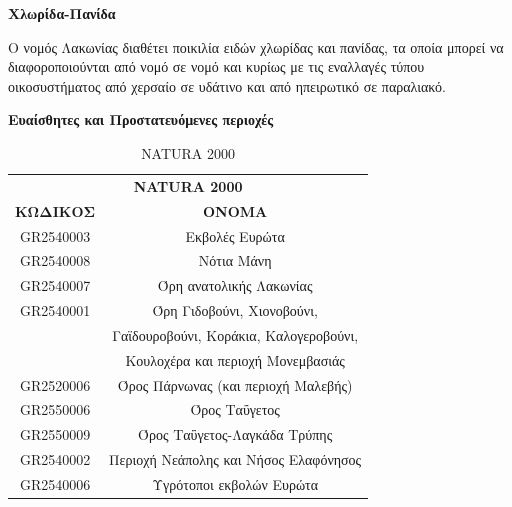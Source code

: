\documentclass[12pt]{article}
\newcommand{\gr}{\selectlanguage{greek}}
\newcommand{\eng}{\selectlanguage{english}}
\begin{document}
	\textbf{Χλωρίδα-Πανίδα}
	
	Ο νομός Λακωνίας διαθέτει ποικιλία ειδών χλωρίδας και πανίδας, τα οποία μπορεί να διαφοροποιούνται από νομό σε νομό και κυρίως με τις εναλλαγές τύπου οικοσυστήματος από χερσαίο σε υδάτινο και από ηπειρωτικό σε παραλιακό.
	
	\textbf{Ευαίσθητες και Προστατευόμενες περιοχές}
	
	\begin{table}[H]
		\centering
		\begin{tabular}{|c|c|}
			\hline
			\multicolumn{2}{|c|}{\textbf{\eng NATURA 2000 \gr}} \\
			\textbf{ΚΩΔΙΚΟΣ} & \textbf{ΟΝΟΜΑ} \\ \hline
			\eng GR2540003 \gr & Εκβολές Ευρώτα \\ \hline
			\eng GR2540008 \gr & Νότια Μάνη \\ \hline
			\eng GR2540007 \gr & Όρη ανατολικής Λακωνίας \\ \hline
			\eng GR2540001 \gr & Όρη Γιδοβούνι, Χιονοβούνι, \\ & Γαϊδουροβούνι, Κοράκια, Καλογεροβούνι, \\ & Κουλοχέρα και περιοχή Μονεμβασιάς \\ \hline
			\eng GR2520006 \gr & Όρος Πάρνωνας (και περιοχή Μαλεβής) \\ \hline
			\eng GR2550006 \gr & Όρος Ταΰγετος \\ \hline
			\eng GR2550009 \gr & Όρος Ταΰγετος-Λαγκάδα Τρύπης \\ \hline
			\eng GR2540002 \gr & Περιοχή Νεάπολης και Νήσος Ελαφόνησος \\ \hline
			\eng GR2540006 \gr & Υγρότοποι εκβολών Ευρώτα \\ \hline
		\end{tabular}
		\caption{\eng NATURA 2000 \gr}
		\label{The label}
	\end{table}
	
\end{document}
